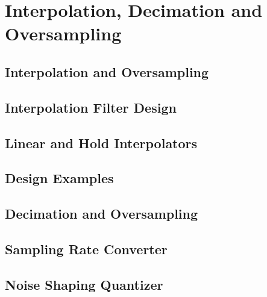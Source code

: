 \section{Interpolation, Decimation and Oversampling}
\subsection{Interpolation and Oversampling}
\subsection{Interpolation Filter Design} %
\subsection{Linear and Hold Interpolators} %
\subsection{Design Examples}
\subsection{Decimation and Oversampling}
\subsection{Sampling Rate Converter}
\subsection{Noise Shaping Quantizer}



